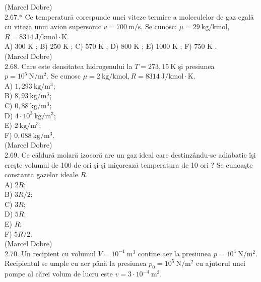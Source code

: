 \documentclass[10pt]{article}
\begin{document}
(Marcel Dobre)\\
2.67.* Ce temperatură corespunde unei viteze termice a moleculelor de gaz egală cu viteza unui avion supersonic $v=700 \mathrm{~m} / \mathrm{s}$. Se cunosc: $\mu=29 \mathrm{~kg} / \mathrm{kmol}$, $R=8314 \mathrm{~J} / \mathrm{kmol} \cdot \mathrm{K}$.\\
A) 300 K ; B) 250 K ; C) 570 K ; D) 800 K ; E) 1000 K ; F) 750 K .\\
(Marcel Dobre)\\
2.68. Care este densitatea hidrogenului la $T=273,15 \mathrm{~K}$ şi presiunea $p=10^{5} \mathrm{~N} / \mathrm{m}^{2}$. Se cunosc $\mu=2 \mathrm{~kg} / \mathrm{kmol}, R=8314 \mathrm{~J} / \mathrm{kmol} \cdot \mathrm{K}$.\\
A) $1,293 \mathrm{~kg} / \mathrm{m}^{3}$;\\
B) $8,93 \mathrm{~kg} / \mathrm{m}^{3}$;\\
C) $0,88 \mathrm{~kg} / \mathrm{m}^{3}$;\\
D) $4 \cdot 10^{3} \mathrm{~kg} / \mathrm{m}^{3}$;\\
E) $2 \mathrm{~kg} / \mathrm{m}^{3}$;\\
F) $0,088 \mathrm{~kg} / \mathrm{m}^{3}$.\\
(Marcel Dobre)\\
2.69. Ce căldură molară izocoră are un gaz ideal care destinzându-se adiabatic îşi creşte volumul de 100 de ori şi-şi miçorează temperatura de 10 ori ? Se cunoaşte constanta gazelor ideale $R$.\\
A) $2 R$;\\
B) $3 R / 2$;\\
C) $3 R$;\\
D) $5 R$;\\
E) $R$;\\
F) $5 R / 2$.\\
(Marcel Dobre)\\
2.70. Un recipient cu volumul $V=10^{-1} \mathrm{~m}^{3}$ contine aer la presiunea $p=10^{4} \mathrm{~N} / \mathrm{m}^{2}$. Recipientul se umple cu aer până la presiunea $p_{0}=10^{5} \mathrm{~N} / \mathrm{m}^{2}$ cu ajutorul unei pompe al cărei volum de lucru este $v=3 \cdot 10^{-4} \mathrm{~m}^{3}$.
\end{document}
